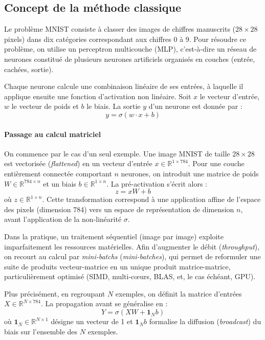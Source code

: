 \documentclass[a4paper,11pt]{article}
\begin{document}
\subsection{Concept de la méthode classique}
Le problème MNIST consiste à classer des images de chiffres manuscrits ($28 \times 28$ pixels) dans dix catégories correspondant aux chiffres 0 à 9. Pour résoudre ce problème, on utilise un perceptron multicouche (MLP), c'est-à-dire un réseau de neurones constitué de plusieurs neurones artificiels organisés en couches (entrée, cachées, sortie).

Chaque neurone calcule une combinaison linéaire de ses entrées, à laquelle il applique ensuite une fonction d'activation non linéaire.
Soit $x$ le vecteur d'entrée, $w$ le vecteur de poids et $b$ le biais. La sortie $y$ d'un neurone est donnée par :
\[ y = \sigma(w \cdot x + b) \]

\paragraph{Passage au calcul matriciel}
On commence par le cas d'un seul exemple. Une image MNIST de taille $28\times 28$ est vectorisée (\textit{flattened}) en un vecteur d'entrée $x\in\mathbb{R}^{1\times 784}$. Pour une couche entièrement connectée comportant $n$ neurones, on introduit une matrice de poids $W\in\mathbb{R}^{784\times n}$ et un biais $b\in\mathbb{R}^{1\times n}$. La pré-activation s'écrit alors :
\[ z = xW + b \]
où $z\in\mathbb{R}^{1\times n}$. Cette transformation correspond à une application affine de l'espace des pixels (dimension 784) vers un espace de représentation de dimension $n$, avant l'application de la non-linéarité $\sigma$.

Dans la pratique, un traitement séquentiel (image par image) exploite imparfaitement les ressources matérielles. Afin d'augmenter le débit (\textit{throughput}), on recourt au calcul par \textit{mini-batchs} (\textit{mini-batches}), qui permet de reformuler une suite de produits vecteur-matrice en un unique produit matrice-matrice, particulièrement optimisé (SIMD, multi-cœurs, BLAS, et, le cas échéant, GPU).

Plus précisément, en regroupant $N$ exemples, on définit la matrice d'entrées $X\in\mathbb{R}^{N\times 784}$. La propagation avant se généralise en :
\[ Y = \sigma(XW + \mathbf{1}_N b) \]
où $\mathbf{1}_N\in\mathbb{R}^{N\times 1}$ désigne un vecteur de 1 et $\mathbf{1}_N b$ formalise la diffusion (\textit{broadcast}) du biais sur l'ensemble des $N$ exemples.
\end{document}
